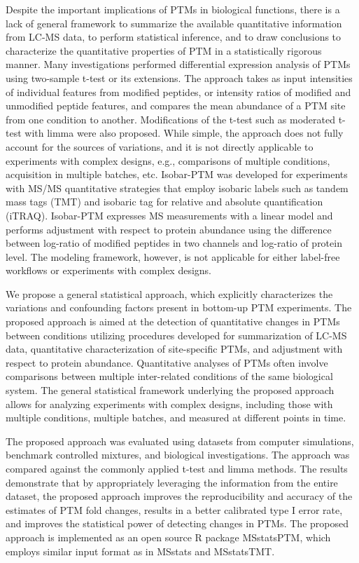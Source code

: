 \documentclass[mcp]{article}
\numberwithin{figure}{section} %
\numberwithin{table}{section}
\begin{document}
Despite the important implications of PTMs in biological functions, there is a lack of general framework to summarize the available quantitative information from LC-MS data, to perform statistical inference, and to draw conclusions to characterize the quantitative properties of PTM in a statistically rigorous manner. Many investigations performed differential expression analysis of PTMs using two-sample t-test or its extensions. The approach takes as input intensities of individual features from modified peptides, or intensity ratios of modified and unmodified peptide features, and compares the mean abundance of a PTM site from one condition to another. Modifications of the t-test such as moderated t-test with limma were also proposed.\cite{Zhu} While simple, the approach does not fully account for the sources of variations, and it is not directly applicable to experiments with complex designs, e.g., comparisons of multiple conditions, acquisition in multiple batches, etc. Isobar-PTM was developed for experiments with MS/MS quantitative strategies that employ isobaric labels such as tandem mass tags (TMT) and isobaric tag for relative and absolute quantification (iTRAQ).\cite{Breitwieser:2013} Isobar-PTM expresses MS measurements with a linear model and performs adjustment with respect to protein abundance using the difference between log-ratio of modified peptides in two channels and log-ratio of protein level. The modeling framework, however, is not applicable for either label-free workflows or experiments with complex designs.
 
We propose a general statistical approach, which explicitly characterizes the variations and confounding factors present in bottom-up PTM experiments. The proposed approach is aimed at the detection of quantitative changes in PTMs between conditions utilizing procedures developed for summarization of LC-MS data, quantitative characterization of site-specific PTMs, and adjustment with respect to protein abundance. Quantitative analyses of PTMs often involve comparisons between multiple inter-related conditions of the same biological system. The general statistical framework underlying the proposed approach allows for analyzing experiments with complex designs, including those with multiple conditions, multiple batches, and measured at different points in time. 

The proposed approach was evaluated using datasets from computer simulations, benchmark controlled mixtures, and biological investigations. The approach was compared against the commonly applied t-test and limma methods. The results demonstrate that by appropriately leveraging the information from the entire dataset, the proposed approach improves the reproducibility and accuracy of the estimates of PTM fold changes, results in a better calibrated type I error rate, and improves the statistical power of detecting changes in PTMs. The proposed approach is implemented as an open source R package MSstatsPTM, which employs similar input format as in MSstats and MSstatsTMT. \cite{Choi:2014} \cite{Huang:2020}
\end{document}

